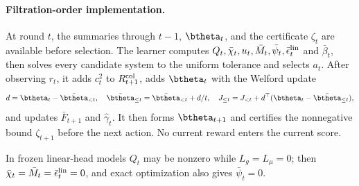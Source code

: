 \paragraph{Filtration-order implementation.}
At round $t$, the summaries through $t-1$, $\btheta_t$, and the certificate
$\zeta_t$ are available before selection.  The learner computes
$Q_t,\bar\chi_t,u_t,\bar M_t,\bar\psi_t,\bar\epsilon_t^{\rm lin}$ and
$\bar\beta_t$, then solves every candidate system to the uniform tolerance
and selects $a_t$.  After observing $r_t$, it adds $c_t^2$ to
$R_{t+1}^{\rm col}$, adds $\btheta_t$ with the Welford update
\[
 d=\btheta_t-\bar\btheta_{<t},\quad
 \bar\btheta_{\le t}=\bar\btheta_{<t}+d/t,\quad
 J_{\le t}=J_{<t}+d^\top(\btheta_t-\bar\btheta_{\le t}),
\]
and updates $\bar F_{t+1}$ and $\hat\gamma_t$.  It then forms
$\btheta_{t+1}$ and certifies the nonnegative bound $\zeta_{t+1}$ before
the next action.  No current reward enters the current score.

In frozen linear-head models $Q_t$ may be nonzero while $L_g=L_\mu=0$;
then $\bar\chi_t=\bar M_t=\bar\epsilon_t^{\rm lin}=0$, and exact
optimization also gives $\bar\psi_t=0$.

